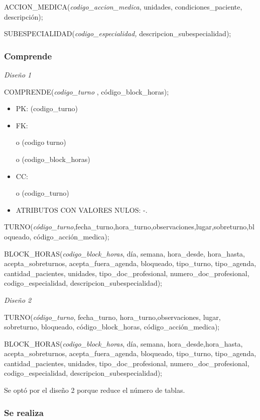 \documentclass[a4paper,11pt]{article}
\begin{document}
ACCION\_MEDICA(\emph{codigo\_accion\_medica}, unidades, condiciones\_paciente, 
descripción);

SUBESPECIALIDAD(\emph{codigo\_especialidad, }descripcion\_subespecialidad);\label{HToc293405849}

\subsubsection{\textbf{Comprende}}

\textit{Diseño 1}

COMPRENDE(\emph{codigo\_turno} , código\_block\_horas);

\begin{itemize}
\item PK: (codigo\_turno)

\item FK: 

o (codigo turno)

o (codigo\_block\_horas)

\item CC:

o (codigo\_turno)

\item ATRIBUTOS CON VALORES NULOS:  -.
\end{itemize}

TURNO(\emph{código\_turno},fecha\_turno,hora\_turno,observaciones,lugar,sobreturno,bloqueado, 
código\_acción\_medica);

BLOCK\_HORAS(\emph{codigo\_block\_horas}, día, semana, hora\_desde, hora\_hasta, 
acepta\_sobreturnos, acepta\_fuera\_agenda, bloqueado, tipo\_turno, tipo\_agenda, 
cantidad\_pacientes, unidades,\emph{ }tipo\_doc\_profesional, numero\_doc\_profesional, 
codigo\_especialidad, descripcion\_subespecialidad);

\textit{Diseño 2}

TURNO(\emph{código\_turno}, fecha\_turno, hora\_turno,observaciones, lugar, sobreturno, 
bloqueado, código\_block\_horas, código\_acción\_medica);

BLOCK\_HORAS(\emph{codigo\_block\_horas}, día, semana, hora\_desde,hora\_hasta, 
acepta\_sobreturnos, acepta\_fuera\_agenda, bloqueado, tipo\_turno, tipo\_agenda, 
cantidad\_pacientes, unidades,\emph{ }tipo\_doc\_profesional, numero\_doc\_profesional, 
codigo\_especialidad, descripcion\_subespecialidad);

Se optó por el diseño 2 porque reduce el número de tablas.\label{HToc293405850}

\subsubsection{\textbf{Se realiza}}
\end{document}
